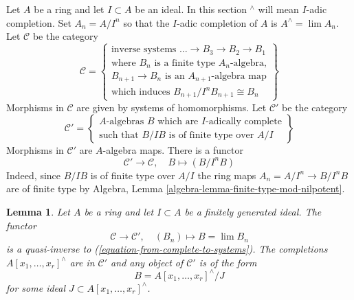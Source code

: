 \documentclass{stacks-project}
\theoremstyle{plain}
\newtheorem{lemma}[subsection]{Lemma}
\theoremstyle{definition}
\theoremstyle{remark}
\numberwithin{equation}{subsection}
\def\lim{\mathop{\mathrm{lim}}\nolimits}
\begin{document}
\noindent
Let $A$ be a ring and let $I \subset A$ be an ideal.
In this section ${}^\wedge$ will mean $I$-adic completion.
Set $A_n = A/I^n$ so that the $I$-adic completion of $A$ is
$A^\wedge = \lim A_n$. Let $\mathcal{C}$ be the
category
\begin{equation}
\label{equation-C}
\mathcal{C} =
\left\{
\begin{matrix}
\text{inverse systems }\ldots \to B_3 \to B_2 \to B_1 \\
\text{where }B_n\text{ is a finite type }A_n\text{-algebra,}\\
B_{n + 1} \to B_n\text{ is an }A_{n + 1}\text{-algebra map}\\
\text{which induces }B_{n + 1}/I^nB_{n + 1} \cong B_n
\end{matrix}
\right\}
\end{equation}
Morphisms in $\mathcal{C}$ are given by systems of homomorphisms.
Let $\mathcal{C}'$ be the category
\begin{equation}
\label{equation-C-prime}
\mathcal{C}' =
\left\{
\begin{matrix}
A\text{-algebras }B\text{ which are }I\text{-adically complete}\\
\text{such that }B/IB\text{ is of finite type over }A/I
\end{matrix}
\right\}
\end{equation}
Morphisms in $\mathcal{C}'$ are $A$-algebra maps. There is a functor
\begin{equation}
\label{equation-from-complete-to-systems}
\mathcal{C}' \longrightarrow \mathcal{C},\quad
B \longmapsto (B/I^nB)
\end{equation}
Indeed, since $B/IB$ is of finite type over $A/I$ the ring maps
$A_n = A/I^n \to B/I^nB$ are of finite type by
Algebra, Lemma \ref{algebra-lemma-finite-type-mod-nilpotent}.

\begin{lemma}
\label{lemma-topologically-finite-type}
Let $A$ be a ring and let $I \subset A$ be a finitely generated ideal.
The functor
$$
\mathcal{C} \longrightarrow \mathcal{C}',\quad
(B_n) \longmapsto B = \lim B_n
$$
is a quasi-inverse to (\ref{equation-from-complete-to-systems}).
The completions $A[x_1, \ldots, x_r]^\wedge$ are in $\mathcal{C}'$ and
any object of $\mathcal{C}'$ is of the form
$$
B = A[x_1, \ldots, x_r]^\wedge / J
$$
for some ideal $J \subset A[x_1, \ldots, x_r]^\wedge$.
\end{lemma}
\end{document}
